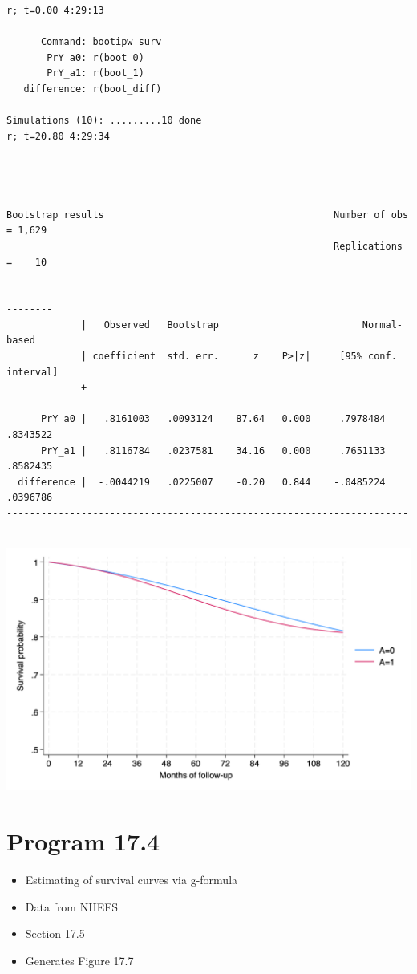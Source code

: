 \documentclass[
  10pt,
  a4paper,
]{book}
\providecommand{\tightlist}{%
  \setlength{\itemsep}{0pt}\setlength{\parskip}{0pt}}
\begin{document}
\begin{verbatim}
r; t=0.00 4:29:13

      Command: bootipw_surv
       PrY_a0: r(boot_0)
       PrY_a1: r(boot_1)
   difference: r(boot_diff)

Simulations (10): .........10 done
r; t=20.80 4:29:34




Bootstrap results                                        Number of obs = 1,629
                                                         Replications  =    10

------------------------------------------------------------------------------
             |   Observed   Bootstrap                         Normal-based
             | coefficient  std. err.      z    P>|z|     [95% conf. interval]
-------------+----------------------------------------------------------------
      PrY_a0 |   .8161003   .0093124    87.64   0.000     .7978484    .8343522
      PrY_a1 |   .8116784   .0237581    34.16   0.000     .7651133    .8582435
  difference |  -.0044219   .0225007    -0.20   0.844    -.0485224    .0396786
------------------------------------------------------------------------------
\end{verbatim}

\begin{center}\includegraphics[width=0.85\linewidth]{./figs/stata-fig-17-3} \end{center}

\section{Program 17.4}\label{program-17.4-1}

\begin{itemize}
\tightlist
\item
  Estimating of survival curves via g-formula
\item
  Data from NHEFS
\item
  Section 17.5
\item
  Generates Figure 17.7
\end{itemize}
\end{document}
